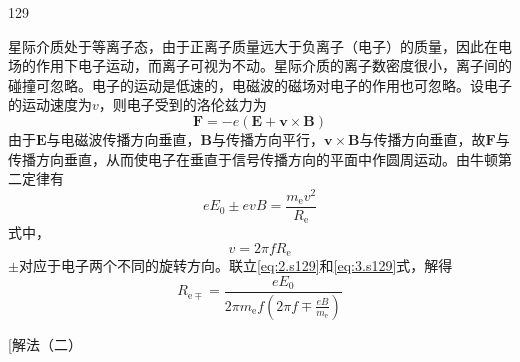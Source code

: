 \begin{solution}{129}
    \begin{subsolution}
        星际介质处于等离子态，由于正离子质量远大于负离子（电子）的质量，因此在电场的作用下电子运动，而离子可视为不动。星际介质的离子数密度很小，离子间的碰撞可忽略。电子的运动是低速的，电磁波的磁场对电子的作用也可忽略。设电子的运动速度为$v$，则电子受到的洛伦兹力为
        \begin{equation}
            \boldsymbol {F} = - e (\boldsymbol {E} + \boldsymbol {v} \times \boldsymbol {B})
            \label{eq:1.s129}
        \end{equation}
        由于$\boldsymbol {E}$与电磁波传播方向垂直，$\boldsymbol {B}$与传播方向平行，$\boldsymbol {v} \times \boldsymbol {B}$与传播方向垂直，故$\boldsymbol {F}$与传播方向垂直，从而使电子在垂直于信号传播方向的平面中作圆周运动。由牛顿第二定律有
        \begin{equation}
            e E _ {0} \pm e v B = \frac {m _ {\mathrm{e}} v ^ {2}}{R _ {\mathrm{e}}}
            \label{eq:2.s129}
        \end{equation}
        式中，
        \begin{equation}
            v = 2 \pi f R _ {\mathrm{e}}
            \label{eq:3.s129}
        \end{equation}
        $\pm$对应于电子两个不同的旋转方向。联立\eqref{eq:2.s129}和\eqref{eq:3.s129}式，解得
        \begin{equation}
            R _ {\mathrm{e} \mp} = \frac {e E _ {0}}{2 \pi m _ {\mathrm{e}} f (2 \pi f \mp \frac {e B}{m _ {\mathrm{e}}})}
            \label{eq:4.s129}
        \end{equation}

        [解法（二）


\end{subsolution}
\end{solution}
